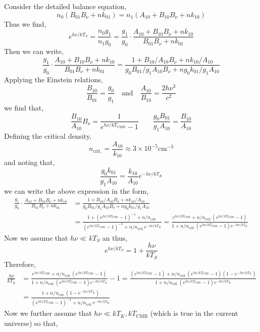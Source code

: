 \documentclass[12pt]{article}
\begin{document}
Consider the detailed balance equation,
\[ n_0 (B_{01} B_\nu + n k_{01}) = n_1 (A_{10} + B_{10} B_\nu + n k_{10}) \]
Thus we find,
\[ e^{h \nu / k T_S} = \frac{n_0 g_1}{n_1 g_0} = \frac{g_1}{g_0} \cdot \frac{A_{10} + B_{10} B_\nu + n k_{10}}{B_{01} B_\nu + n k_{01}} \]
Then we can write,
\[ \frac{g_1}{g_0} \cdot \frac{A_{10} + B_{10} B_\nu + n k_{10}}{B_{01} B_\nu + n k_{01}} = \frac{1 + B_{10}/A_{10} B_\nu + n k_{10} / A_{10}}{g_0 B_{01} / g_1 A_{10} B_\nu + n g_0 k_{01} / g_1 A_{10}} \]
Applying the Einstein relations,
\[  \frac{B_{10}}{B_{01}} = \frac{g_0}{g_1}  \quad \text{and} \quad \frac{A_{10}}{B_{10}} = \frac{2 h \nu^3}{c^2} \]
we find that,
\[ \frac{B_{10}}{A_{10}} B_\nu = \frac{1}{e^{h\nu / k T_\text{CMB}} - 1} \quad \quad \frac{g_0 B_{01}}{g_1 A_{10}} = \frac{B_{10}}{A_{10}} \]
Defining the critical density,
\[ n_{\text{crit.}} = \frac{A_{10}}{k_{10}} \approx 3 \times 10^{-5} \text{cm}^{-3} \]
and noting that,
\[ \frac{g_0 k_{01}}{g_1 A_{10}} = \frac{k_{10}}{A_{10}} e^{-h \nu / k T_K} \]
we can write the above expression in the form,
\begin{align*}
\frac{g_1}{g_0} \cdot \frac{A_{10} + B_{10} B_\nu + n k_{10}}{B_{01} B_\nu + n k_{01}} & = \frac{1 + B_{10}/A_{10} B_\nu + n k_{10} / A_{10}}{g_0 B_{01} / g_1 A_{10} B_\nu + n g_0 k_{01} / g_1 A_{10}}
\\
& = \frac{1 + (e^{h \nu / k T_{\text{CMB}}} - 1)^{-1} + n/n_{\text{crit.}}}{(e^{h \nu / k T_{\text{CMB}}} - 1)^{-1} + n/n_{\text{crit.}} e^{- h\nu / k T_K}} =  \frac{e^{h \nu / k T_{\text{CMB}}} + n / n_{\text{crit.}} (e^{h \nu / k T_{\text{CMB}}} - 1)}{1 + n / n_{\text{crit.}} (e^{h \nu / k T_{\text{CMB}}} - 1)e^{- h\nu / k T_K} } 
\end{align*}
Now we assume that $h \nu \ll k T_S$ an thus,
\[ e^{h \nu / k T_S} = 1 + \frac{h \nu}{k T_S} \]
Therefore,
\begin{align*}
\frac{h \nu}{k T_S} & = \frac{e^{h \nu / k T_{\text{CMB}}} + n / n_{\text{crit.}} (e^{h \nu / k T_{\text{CMB}}} - 1)}{1 + n / n_{\text{crit.}} (e^{h \nu / k T_{\text{CMB}}} - 1)e^{- h\nu / k T_K} }  - 1 = \frac{(e^{h \nu / k T_{\text{CMB}}} - 1) + n / n_{\text{crit.}} (e^{h \nu / k T_{\text{CMB}}} - 1)(1 - e^{- h\nu / k T_K})}{1 + n / n_{\text{crit.}} (e^{h \nu / k T_{\text{CMB}}} - 1)e^{- h\nu / k T_K} }
\\
& = \frac{1 + n / n_{\text{crit.}} (1 - e^{- h\nu / k T_K})}{(e^{h \nu / k T_{\text{CMB}}} - 1)^{-1} + n / n_{\text{crit.}} e^{- h\nu / k T_K} }
\end{align*}
Now we further assume that $h \nu \ll k T_K, k T_{\text{CMB}}$ (which is true in the current universe) so that,
\end{document}
